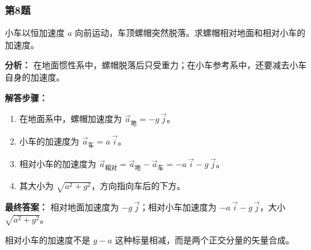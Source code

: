 \documentclass[12pt,a4paper]{ctexart}
\begin{document}
\subsubsection*{第8题}
\begin{tcolorbox}[colback=gray!2!white,colframe=black!60,title={题目}]
小车以恒加速度 \(a\) 向前运动，车顶螺帽突然脱落。求螺帽相对地面和相对小车的加速度。\par
\end{tcolorbox}
\begin{tcolorbox}[colback=blue!2!white,colframe=blue!55!black,title={完整答案}]
\textbf{分析：}
在地面惯性系中，螺帽脱落后只受重力；在小车参考系中，还要减去小车自身的加速度。\par
\textbf{解答步骤：}
\begin{enumerate}
\item 在地面系中，螺帽加速度为 \(\vec a_{\text{地}}=-g\,\vec j\)。
\item 小车的加速度为 \(\vec a_{\text{车}}=a\,\vec i\)。
\item 相对小车的加速度为 \(\vec a_{\text{相对}}=\vec a_{\text{地}}-\vec a_{\text{车}}=-a\,\vec i-g\,\vec j\)。
\item 其大小为 \(\sqrt{a^2+g^2}\)，方向指向车后的下方。
\end{enumerate}
\textbf{最终答案：}
相对地面加速度为 \(-g\,\vec j\)；相对小车加速度为 \(-a\,\vec i-g\,\vec j\)，大小 \(\sqrt{a^2+g^2}\)。\par
\end{tcolorbox}
\begin{tcolorbox}[colback=red!2!white,colframe=red!55!black,title={易错点}]
相对小车的加速度不是 \(g-a\) 这种标量相减，而是两个正交分量的矢量合成。\par
\end{tcolorbox}
\end{document}
